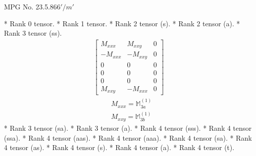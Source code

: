\documentclass[fleqn,8pt,landscape]{jsarticle}
\begin{document}
\setcounter{MaxMatrixCols}{32}

\renewcommand{\tablename}{Table~}
\renewcommand{\figurename}{Figure~}
\begin{center}
\LARGE
MPG No. 23.5.86\quad$6'/m'$
\end{center}
* Rank 0 tensor.
* Rank 1 tensor.
* Rank 2 tensor (s).
* Rank 2 tensor (a).
* Rank 3 tensor (ss).
\begin{align*}
\begin{bmatrix} M_{xxx} & M_{xxy} & 0 \\ - M_{xxx} & - M_{xxy} & 0 \\ 0 & 0 & 0 \\ 0 & 0 & 0 \\ 0 & 0 & 0 \\ M_{xxy} & - M_{xxx} & 0 \end{bmatrix}
\end{align*}
\begin{align*}
& M_{xxx} = \mathbb{M}_{3a}^{(1)} \\
& M_{xxy} = \mathbb{M}_{3b}^{(1)}
\end{align*}
* Rank 3 tensor (sa).
* Rank 3 tensor (a).
* Rank 4 tensor (sss).
* Rank 4 tensor (ssa).
* Rank 4 tensor (aas).
* Rank 4 tensor (aaa).
* Rank 4 tensor (sa).
* Rank 4 tensor (as).
* Rank 4 tensor (s).
* Rank 4 tensor (a).
* Rank 4 tensor (t).
\end{document}
